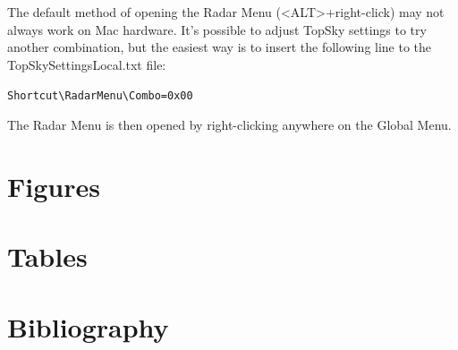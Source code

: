 \documentclass[a4paper,oneside,11pt]{memoir}
\begin{document}
The default method of opening the Radar Menu (<ALT>+right-click) may not always work on Mac hardware. It’s possible to adjust TopSky settings to try another combination, but the easiest way is to insert the following line to the TopSkySettingsLocal.txt file:

\verb|Shortcut\RadarMenu\Combo=0x00|

The Radar Menu is then opened by right-clicking anywhere on the Global Menu.

\appendix

\chapter{Figures}

\begin{KeepFromToc}
\listoffigures
\end{KeepFromToc}

\chapter{Tables}

\begin{KeepFromToc}
\listoftables
\end{KeepFromToc}

\chapter{Bibliography}
\begin{KeepFromToc}
\nocite{*}
\printbibliography
\end{KeepFromToc}
\end{document}
